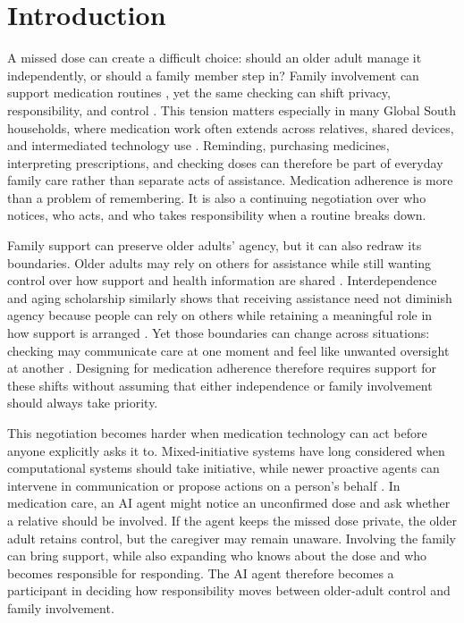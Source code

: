 \section{Introduction}

A missed dose can create a difficult choice: should an older adult manage it independently, or should a family member step in? Family involvement can support medication routines \cite{92}, yet the same checking can shift privacy, responsibility, and control \cite{24,115}. This tension matters especially in many Global South households, where medication work often extends across relatives, shared devices, and intermediated technology use \cite{3,98}. Reminding, purchasing medicines, interpreting prescriptions, and checking doses can therefore be part of everyday family care rather than separate acts of assistance. Medication adherence is more than a problem of remembering. It is also a continuing negotiation over who notices, who acts, and who takes responsibility when a routine breaks down.

Family support can preserve older adults' agency, but it can also redraw its boundaries. Older adults may rely on others for assistance while still wanting control over how support and health information are shared \cite{13,24,30,50}. Interdependence and aging scholarship similarly shows that receiving assistance need not diminish agency because people can rely on others while retaining a meaningful role in how support is arranged \cite{13,30,33}. Yet those boundaries can change across situations: checking may communicate care at one moment and feel like unwanted oversight at another \cite{24,115}. Designing for medication adherence therefore requires support for these shifts without assuming that either independence or family involvement should always take priority.

This negotiation becomes harder when medication technology can act before anyone explicitly asks it to. Mixed-initiative systems have long considered when computational systems should take initiative, while newer proactive agents can intervene in communication or propose actions on a person's behalf \cite{45,52}. In medication care, an AI agent might notice an unconfirmed dose and ask whether a relative should be involved. If the agent keeps the missed dose private, the older adult retains control, but the caregiver may remain unaware. Involving the family can bring support, while also expanding who knows about the dose and who becomes responsible for responding. The AI agent therefore becomes a participant in deciding how responsibility moves between older-adult control and family involvement.

